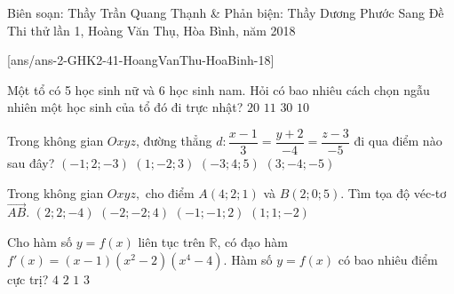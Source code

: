 
\begin{name}
	{Biên soạn: Thầy Trần Quang Thạnh \& Phản biện: Thầy Dương Phước Sang}
	{Đề Thi thử lần 1, Hoàng Văn Thụ, Hòa Bình, năm 2018}
\end{name}
\setcounter{ex}{0}\setcounter{bt}{0}
[ans/ans-2-GHK2-41-HoangVanThu-HoaBinh-18]
 \begin{ex}%
	Một tổ có 5 học sinh nữ và 6 học sinh nam. Hỏi có bao nhiêu cách chọn ngẫu nhiên một học sinh của tổ đó đi trực nhật?
	\choice
	{$20$}
	{\True $11$}
	{$30$}
	{$10$}
\end{ex}
 \begin{ex}%
	Trong không gian $Oxyz$, đường thẳng $d \colon \dfrac{x-1}{3}= \dfrac{y+2}{-4}= \dfrac{z-3}{-5}$ đi qua điểm nào sau đây? 
	\choice
	{$(-1;2;-3)$}
	{\True $(1; -2; 3)$}
	{$(-3; 4; 5)$}
	{$(3; -4; -5)$}
\end{ex}
 \begin{ex}%
	Trong không gian $Oxyz,$ cho điểm $A(4; 2; 1)$ và $B(2; 0; 5)$. Tìm tọa độ véc-tơ $\vec{AB}$.
	\choice
	{$(2; 2; -4)$}
	{\True $(-2; -2; 4)$}
	{$(-1; -1; 2)$}
	{$(1; 1; -2)$}
\end{ex}
 \begin{ex}%
	Cho hàm số $y=f(x)$ liên tục trên $\mathbb{R}$, có đạo hàm $f'(x) = (x-1)(x^2 - 2)(x^4 -4)$. Hàm số $y = f(x)$ có bao nhiêu điểm cực trị?
	\choice
	{$4$}
	{$2$}
	{\True $1$}
	{$3$}
\end{ex}
